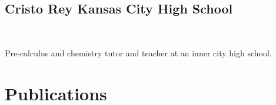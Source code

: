 \documentclass[letterpaper]{deedy-resume} %
\begin{document}
\begin{minipage}[t]{0.66\textwidth}
\sectionspace %


\subsection{Cristo Rey Kansas City High School}
 \hfill {} \\
\begin{tightitemize}
\item Pre-calculus and chemistry tutor and teacher at an inner city high school. 
\end{tightitemize}

\sectionspace %



\section{Publications} 



\end{minipage}
\end{document}
